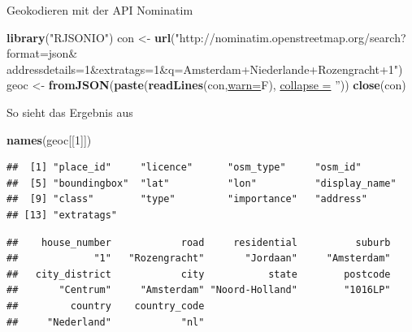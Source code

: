 \documentclass[ignorenonframetext,]{beamer}
\newenvironment{Shaded}{\begin{snugshade}}{\end{snugshade}}
\newcommand{\DataTypeTok}[1]{\textcolor[rgb]{0.74,0.68,0.62}{\underline{#1}}}
\newcommand{\DecValTok}[1]{\textcolor[rgb]{0.27,0.67,0.26}{#1}}
\newcommand{\KeywordTok}[1]{\textcolor[rgb]{0.26,0.66,0.93}{\textbf{#1}}}
\newcommand{\NormalTok}[1]{\textcolor[rgb]{0.74,0.68,0.62}{#1}}
\newcommand{\OperatorTok}[1]{\textcolor[rgb]{0.74,0.68,0.62}{#1}}
\newcommand{\StringTok}[1]{\textcolor[rgb]{0.02,0.61,0.04}{#1}}
\begin{document}
\begin{frame}[fragile]{Geokodieren mit der API Nominatim}
\protect\hypertarget{geokodieren-mit-der-api-nominatim}{}

\begin{Shaded}
\begin{Highlighting}[]
\KeywordTok{library}\NormalTok{(}\StringTok{"RJSONIO"}\NormalTok{)}
\NormalTok{con <-}\StringTok{ }\KeywordTok{url}\NormalTok{(}\StringTok{"http://nominatim.openstreetmap.org/search?format=json&}
\StringTok{           addressdetails=1&extratags=1&q=Amsterdam+Niederlande+Rozengracht+1"}\NormalTok{)}
\NormalTok{geoc <-}\StringTok{ }\KeywordTok{fromJSON}\NormalTok{(}\KeywordTok{paste}\NormalTok{(}\KeywordTok{readLines}\NormalTok{(con,}\DataTypeTok{warn=}\NormalTok{F), }
                       \DataTypeTok{collapse =} \StringTok{''}\NormalTok{))}
\KeywordTok{close}\NormalTok{(con)}
\end{Highlighting}
\end{Shaded}

\end{frame}

\begin{frame}[fragile]{So sieht das Ergebnis aus}
\protect\hypertarget{so-sieht-das-ergebnis-aus}{}

\begin{Shaded}
\begin{Highlighting}[]
\KeywordTok{names}\NormalTok{(geoc[[}\DecValTok{1}\NormalTok{]])}
\end{Highlighting}
\end{Shaded}

\begin{verbatim}
##  [1] "place_id"     "licence"      "osm_type"     "osm_id"      
##  [5] "boundingbox"  "lat"          "lon"          "display_name"
##  [9] "class"        "type"         "importance"   "address"     
## [13] "extratags"
\end{verbatim}

\begin{Shaded}
\end{Shaded}

\begin{verbatim}
##    house_number            road     residential          suburb 
##             "1"   "Rozengracht"       "Jordaan"     "Amsterdam" 
##   city_district            city           state        postcode 
##       "Centrum"     "Amsterdam" "Noord-Holland"        "1016LP" 
##         country    country_code 
##     "Nederland"            "nl"
\end{verbatim}

\end{frame}
\end{document}
